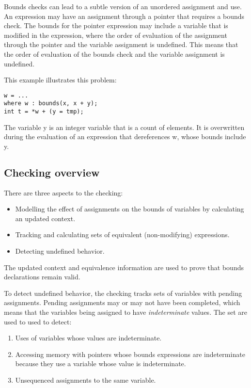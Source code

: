 Bounds checks can lead to a subtle version of an unordered assignment
and use.  An expression may have an assignment through a pointer that requires a
bounds check. The bounds for the pointer expression may include a
variable that is modified in the expression, where the order of
evaluation of the assignment through the pointer and the variable
assignment is undefined. This means that the order of evaluation of the
bounds check and the variable assignment is undefined.

This example illustrates this problem:

\begin{lstlisting}
w = ...
where w : bounds(x, x + y);
int t = *w + (y = tmp);
\end{lstlisting}

The variable y is an integer variable that is a count of elements. It is
overwritten during the evaluation of an expression that dereferences w,
whose bounds include y.

\subsection{Checking overview}
There are three aspects to the checking:
\begin{itemize}
\item Modelling the effect of assignments on the bounds
of variables by calculating an updated context.
\item Tracking and calculating sets of equivalent (non-modifying) expressions.
\item Detecting undefined behavior.
\end{itemize}
The updated context and equivalence information are used to prove that bounds
declarations remain valid. 

To detect undefined behavior, the checking tracks
sets of variables with pending assignments.  Pending
assignments may or may not have been completed, which means
that the variables being assigned to have {\em indeterminate}
values.  The set are used to used to detect:
\begin{enumerate}
\item Uses of variables whose values are indeterminate.
\item Accessing memory with pointers whose bounds expressions
are indeterminate because they use a variable whose value is indeterminate.
\item Unsequenced assignments to the  same variable.
\end{enumerate}

